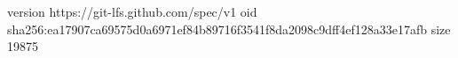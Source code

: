 version https://git-lfs.github.com/spec/v1
oid sha256:ea17907ca69575d0a6971ef84b89716f3541f8da2098c9dff4ef128a33e17afb
size 19875
